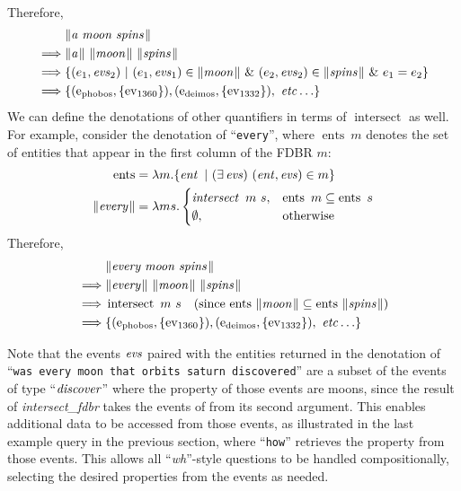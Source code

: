 \documentclass[../main.tex]{subfiles}
\begin{document}
\begin{refsection}
\begin{equation*}
\begin{split}
	\end{split}
\end{equation*}
Therefore,
\begin{equation*}
	\begin{split}
		&\meaningof{a\ moon\ spins} \\
		\implies & \meaningof{a}\ \meaningof{moon}\ \meaningof{spins} \\
		\implies & \{(e_1,\evs_2)\ |\ (e_1,\evs_1) \in \meaningof{moon}\ \&\ (e_2,\evs_2) \in \meaningof{spins}\ \&\ e_1 = e_2\} \\
		\implies & \{(\entityassoc{phobos}, \{\eventassoc{1360}\}), (\entityassoc{deimos}, \{\eventassoc{1332}\}),\ \etc\}
	\end{split}
\end{equation*}
We can define the denotations of other quantifiers in terms of $\operatorname{intersect}$ as well.  For example, consider the denotation of ``\texttt{every}'', where $\operatorname{ents}\ m$ denotes the set of entities that appear in the first column of the FDBR $m$:
\begin{equation*}
	\begin{split}
		\operatorname{ents} &= \lambda m.\{ \operatorname{\mathit{ent}}\ |\ (\exists \operatorname{\mathit{evs}})\ (\operatorname{\mathit{ent}}, \operatorname{\mathit{evs}}) \in m \} \\
		\lVert\textit{every\hspace{0.1em}}\rVert &= \lambda ms.
		\begin{cases}
			\operatorname{\mathit{intersect}}\ m\ s, & \operatorname{ents}\ m \subseteq \operatorname{ents}\ s \\
			\emptyset, & \text{otherwise}
		\end{cases}
	\end{split}
\end{equation*}
Therefore,
\begin{equation*}
	\begin{split}
		&\meaningof{every moon spins} \\
		\implies & \meaningof{every}\ \meaningof{moon}\ \meaningof{spins} \\
		\implies & \operatorname{intersect}\ m\ s\quad\dmathrm{(since $\operatorname{ents}\ \meaningof{moon} \subseteq \operatorname{ents}\ \meaningof{spins}$)} \\
		\implies & \{(\entityassoc{phobos}, \{\eventassoc{1360}\}), (\entityassoc{deimos}, \{\eventassoc{1332}\}),\ \etc\}
	\end{split}
\end{equation*}

\noindent Note that the events $\operatorname{\mathit{evs}}$ paired with the entities returned in the denotation of ``\texttt{was every moon that orbits saturn discovered}'' are a subset of the events of type ``$\operatorname{\mathit{discover}}$'' where the  property of those events are moons, since the result of \textit{intersect\_fdbr} takes the events of from its second argument. This enables additional data to be accessed from those events, as illustrated in the last example query in the previous section, where ``\texttt{how}'' retrieves the  property from those events.  This allows all ``\textit{wh}''-style questions to be handled compositionally, selecting the desired properties from the events as needed.


\end{refsection}
\end{document}
